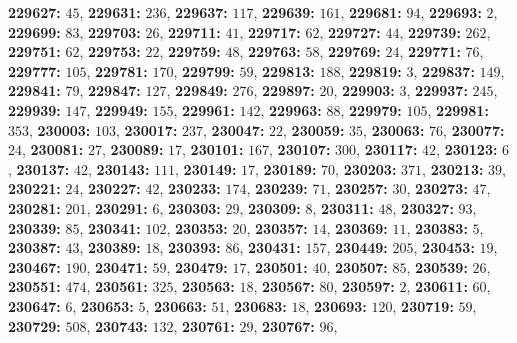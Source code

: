 \textsf{\bfseries 229627:} $45$, \textsf{\bfseries 229631:} $236$, \textsf{\bfseries 229637:} $117$, \textsf{\bfseries 229639:} $161$, \textsf{\bfseries 229681:} $94$, \textsf{\bfseries 229693:} $2$, \textsf{\bfseries 229699:} $83$, \textsf{\bfseries 229703:} $26$, \textsf{\bfseries 229711:} $41$, \textsf{\bfseries 229717:} $62$, \textsf{\bfseries 229727:} $44$, \textsf{\bfseries 229739:} $262$, \textsf{\bfseries 229751:} $62$, \textsf{\bfseries 229753:} $22$, \textsf{\bfseries 229759:} $48$, \textsf{\bfseries 229763:} $58$, \textsf{\bfseries 229769:} $24$, \textsf{\bfseries 229771:} $76$, \textsf{\bfseries 229777:} $105$, \textsf{\bfseries 229781:} $170$, \textsf{\bfseries 229799:} $59$, \textsf{\bfseries 229813:} $188$, \textsf{\bfseries 229819:} $3$, \textsf{\bfseries 229837:} $149$, \textsf{\bfseries 229841:} $79$, \textsf{\bfseries 229847:} $127$, \textsf{\bfseries 229849:} $276$, \textsf{\bfseries 229897:} $20$, \textsf{\bfseries 229903:} $3$, \textsf{\bfseries 229937:} $245$, \textsf{\bfseries 229939:} $147$, \textsf{\bfseries 229949:} $155$, \textsf{\bfseries 229961:} $142$, \textsf{\bfseries 229963:} $88$, \textsf{\bfseries 229979:} $105$, \textsf{\bfseries 229981:} $353$, \textsf{\bfseries 230003:} $103$, \textsf{\bfseries 230017:} $237$, \textsf{\bfseries 230047:} $22$, \textsf{\bfseries 230059:} $35$, \textsf{\bfseries 230063:} $76$, \textsf{\bfseries 230077:} $24$, \textsf{\bfseries 230081:} $27$, \textsf{\bfseries 230089:} $17$, \textsf{\bfseries 230101:} $167$, \textsf{\bfseries 230107:} $300$, \textsf{\bfseries 230117:} $42$, \textsf{\bfseries 230123:} $6$, \textsf{\bfseries 230137:} $42$, \textsf{\bfseries 230143:} $111$, \textsf{\bfseries 230149:} $17$, \textsf{\bfseries 230189:} $70$, \textsf{\bfseries 230203:} $371$, \textsf{\bfseries 230213:} $39$, \textsf{\bfseries 230221:} $24$, \textsf{\bfseries 230227:} $42$, \textsf{\bfseries 230233:} $174$, \textsf{\bfseries 230239:} $71$, \textsf{\bfseries 230257:} $30$, \textsf{\bfseries 230273:} $47$, \textsf{\bfseries 230281:} $201$, \textsf{\bfseries 230291:} $6$, \textsf{\bfseries 230303:} $29$, \textsf{\bfseries 230309:} $8$, \textsf{\bfseries 230311:} $48$, \textsf{\bfseries 230327:} $93$, \textsf{\bfseries 230339:} $85$, \textsf{\bfseries 230341:} $102$, \textsf{\bfseries 230353:} $20$, \textsf{\bfseries 230357:} $14$, \textsf{\bfseries 230369:} $11$, \textsf{\bfseries 230383:} $5$, \textsf{\bfseries 230387:} $43$, \textsf{\bfseries 230389:} $18$, \textsf{\bfseries 230393:} $86$, \textsf{\bfseries 230431:} $157$, \textsf{\bfseries 230449:} $205$, \textsf{\bfseries 230453:} $19$, \textsf{\bfseries 230467:} $190$, \textsf{\bfseries 230471:} $59$, \textsf{\bfseries 230479:} $17$, \textsf{\bfseries 230501:} $40$, \textsf{\bfseries 230507:} $85$, \textsf{\bfseries 230539:} $26$, \textsf{\bfseries 230551:} $474$, \textsf{\bfseries 230561:} $325$, \textsf{\bfseries 230563:} $18$, \textsf{\bfseries 230567:} $80$, \textsf{\bfseries 230597:} $2$, \textsf{\bfseries 230611:} $60$, \textsf{\bfseries 230647:} $6$, \textsf{\bfseries 230653:} $5$, \textsf{\bfseries 230663:} $51$, \textsf{\bfseries 230683:} $18$, \textsf{\bfseries 230693:} $120$, \textsf{\bfseries 230719:} $59$, \textsf{\bfseries 230729:} $508$, \textsf{\bfseries 230743:} $132$, \textsf{\bfseries 230761:} $29$, \textsf{\bfseries 230767:} $96$, 

